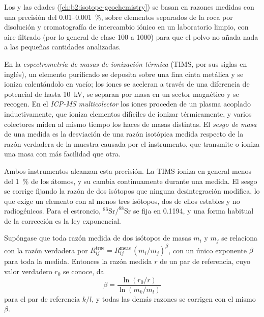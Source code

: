 Los  y las edades (\cref{ch:b2:isotope-geochemistry}) se basan en razones medidas
con una precisión del 0.01--\qty{0.001}{\percent}, sobre elementos separados de la roca por disolución
y cromatografía de intercambio iónico en un laboratorio limpio, con aire filtrado (por lo general de clase 100 a
1000) para que el polvo no añada nada a las pequeñas cantidades analizadas.

\begin{definition}\label{def:b2:field-lab-methods-2:tims}
En la \emph{espectrometría de masas de ionización térmica} (TIMS, por sus siglas en inglés), un
elemento purificado se deposita sobre una fina cinta metálica y se ioniza calentándolo en vacío; los iones
se aceleran a través de una diferencia de potencial de hasta \qty{10}{kV}, se separan por masa en un sector magnético
y se recogen. En el \emph{ICP-MS multicolector} los iones proceden de un
plasma acoplado inductivamente, que ioniza elementos difíciles de ionizar térmicamente, y varios
colectores miden al mismo tiempo los haces de masas distintas. El \emph{sesgo
de masa} de una medida es la desviación de una razón isotópica medida respecto de la razón
verdadera de la muestra causada por el instrumento, que transmite o ioniza una masa con más facilidad que
otra.
\end{definition}

Ambos instrumentos alcanzan esta precisión. La TIMS ioniza en general menos del
\qty{1}{\percent} de los átomos, y su  cambia continuamente durante una medida. El sesgo se corrige fijando la razón de dos isótopos que ninguna
desintegración modifica, lo que exige un elemento con al menos tres isótopos, dos de ellos estables y no
radiogénicos. Para el estroncio, $^{86}\mathrm{Sr}/^{88}\mathrm{Sr}$ se fija en 0.1194, y una
forma habitual de la corrección es la ley exponencial.

\begin{proposition}\label{prop:b2:field-lab-methods-2:bias}
Supóngase que toda razón medida de dos isótopos de masas $m_i$ y $m_j$ se relaciona con la razón
verdadera por $R_{ij}^{\mathrm{true}} = R_{ij}^{\mathrm{meas}}\,(m_i/m_j)^{\beta}$, con un único exponente
$\beta$ para toda la medida. Entonces la razón medida $r$ de un par de referencia, cuyo valor verdadero
$r_0$ se conoce, da
\begin{equation}
\beta = \frac{\ln(r_0/r)}{\ln(m_k/m_l)}
\label{eq:b2:field-lab-methods-2:beta}
\end{equation}
para el par de referencia $k/l$, y todas las demás razones se corrigen con el mismo $\beta$.
\end{proposition}

